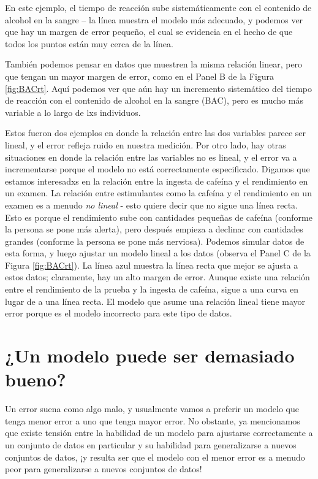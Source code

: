 \documentclass[
  12pt,
]{book}
\begin{document}
En este ejemplo, el tiempo de reacción sube sistemáticamente con el contenido de alcohol en la sangre -- la línea muestra el modelo más adecuado, y podemos ver que hay un margen de error pequeño, el cual se evidencia en el hecho de que todos los puntos están muy cerca de la línea.

También podemos pensar en datos que muestren la misma relación linear, pero que tengan un mayor margen de error, como en el Panel B de la Figura \ref{fig:BACrt}. Aquí podemos ver que aún hay un incremento sistemático del tiempo de reacción con el contenido de alcohol en la sangre (BAC), pero es mucho más variable a lo largo de lxs individuos.

Estos fueron dos ejemplos en donde la relación entre las dos variables parece ser lineal, y el error refleja ruido en nuestra medición. Por otro lado, hay otras situaciones en donde la relación entre las variables no es lineal, y el error va a incrementarse porque el modelo no está correctamente especificado. Digamos que estamos interesadxs en la relación entre la ingesta de cafeína y el rendimiento en un examen. La relación entre estimulantes como la cafeína y el rendimiento en un examen es a menudo \emph{no lineal} - esto quiere decir que no sigue una línea recta. Esto es porque el rendimiento sube con cantidades pequeñas de cafeína (conforme la persona se pone más alerta), pero después empieza a declinar con cantidades grandes (conforme la persona se pone más nerviosa). Podemos simular datos de esta forma, y luego ajustar un modelo lineal a los datos (observa el Panel C de la Figura \ref{fig:BACrt}). La línea azul muestra la línea recta que mejor se ajusta a estos datos; claramente, hay un alto margen de error. Aunque existe una relación entre el rendimiento de la prueba y la ingesta de cafeína, sigue a una curva en lugar de a una línea recta. El modelo que asume una relación lineal tiene mayor error porque es el modelo incorrecto para este tipo de datos.

\hypertarget{overfitting}{%
\section{¿Un modelo puede ser demasiado bueno?}\label{overfitting}}

Un error suena como algo malo, y usualmente vamos a preferir un modelo que tenga menor error a uno que tenga mayor error. No obstante, ya mencionamos que existe tensión entre la habilidad de un modelo para ajustarse correctamente a un conjunto de datos en particular y su habilidad para generalizarse a nuevos conjuntos de datos, ¡y resulta ser que el modelo con el menor error es a menudo peor para generalizarse a nuevos conjuntos de datos!
\end{document}
